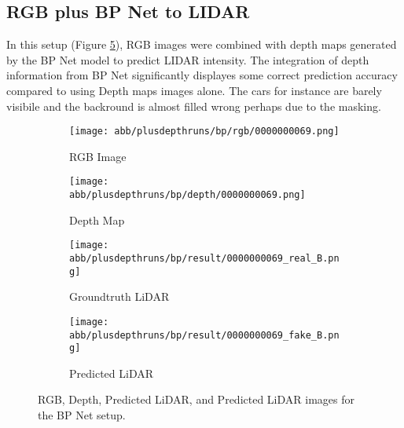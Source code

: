 \subsection{RGB plus BP Net to LIDAR}
In this setup (Figure \ref{bp_rgbd}), RGB images were combined with depth maps generated by the BP Net model to predict LIDAR intensity. The integration of depth information from BP Net significantly displayes some correct prediction accuracy compared to using Depth maps images alone. The cars for instance are barely visibile and the backround is almost filled wrong perhaps due to the masking.
\begin{figure}[!ht]
	\centering
	\begin{subfigure}{0.4\textwidth}
		\centering
		\texttt{[image: abb/plusdepthruns/bp/rgb/0000000069.png]}
		\caption{RGB Image}
		\label{bp_rgbd1}
	\end{subfigure}
	
	\vspace{1em} %
	
	\begin{subfigure}{0.4\textwidth}
		\centering
		\texttt{[image: abb/plusdepthruns/bp/depth/0000000069.png]}
		\caption{Depth Map}
		\label{bp_rgbd2}
	\end{subfigure}
	
	\vspace{1em} %
	
	\begin{subfigure}{0.25\textwidth}
		\centering
		\texttt{[image: abb/plusdepthruns/bp/result/0000000069\_real\_B.png]}
		\caption{Groundtruth LiDAR}
		\label{fig:bp_pred_lidar}
	\end{subfigure}
	\begin{subfigure}{0.25\textwidth}
		\centering
		\texttt{[image: abb/plusdepthruns/bp/result/0000000069\_fake\_B.png]}
		\caption{Predicted LiDAR}
		\label{fig:bp_fake_lidar}
	\end{subfigure}
	
	\caption{RGB, Depth, Predicted LiDAR, and Predicted LiDAR images for the BP Net setup.}
	\label{bp_rgbd}
\end{figure}
\newpage
